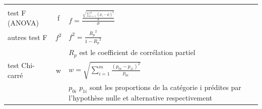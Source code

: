 \documentclass[12pt,]{book}
\begin{document}
\begin{longtable}[]{@{}lcl@{}}
\begin{minipage}[t]{0.46\columnwidth}
\end{minipage}\tabularnewline
\begin{minipage}[t]{0.11\columnwidth}\raggedright
test F (ANOVA)\strut
\end{minipage} & \begin{minipage}[t]{0.35\columnwidth}\centering
f\strut
\end{minipage} & \begin{minipage}[t]{0.46\columnwidth}\raggedright
\(f = \frac{\frac{\sqrt{\sum_{i=1}^k (\mu_i - \mu)^2}}{k}}{\sigma}\)\strut
\end{minipage}\tabularnewline
\begin{minipage}[t]{0.11\columnwidth}\raggedright
autres test F\strut
\end{minipage} & \begin{minipage}[t]{0.35\columnwidth}\centering
\(f^2\)\strut
\end{minipage} & \begin{minipage}[t]{0.46\columnwidth}\raggedright
\(f^2 = \frac{{R_p}^2}{1-{R_p}^2}\)\strut
\end{minipage}\tabularnewline
\begin{minipage}[t]{0.11\columnwidth}\raggedright
\strut
\end{minipage} & \begin{minipage}[t]{0.35\columnwidth}\centering
\strut
\end{minipage} & \begin{minipage}[t]{0.46\columnwidth}\raggedright
\({R_p}\) est le coefficient de corrélation partiel\strut
\end{minipage}\tabularnewline
\begin{minipage}[t]{0.11\columnwidth}\raggedright
test Chi-carré\strut
\end{minipage} & \begin{minipage}[t]{0.35\columnwidth}\centering
w\strut
\end{minipage} & \begin{minipage}[t]{0.46\columnwidth}\raggedright
\(w = \sqrt{ \sum_{i=1}^m \frac{(p_{0i} - p_{1i})^2 }{ p_{0i}} }\)\strut
\end{minipage}\tabularnewline
\begin{minipage}[t]{0.11\columnwidth}\raggedright
\strut
\end{minipage} & \begin{minipage}[t]{0.35\columnwidth}\centering
\strut
\end{minipage} & \begin{minipage}[t]{0.46\columnwidth}\raggedright
\(p_{0i}\) \(p_{1i}\) sont les proportions de la catégorie i prédites par l'hypothèse nulle et alternative respectivement\strut
\end{minipage}\tabularnewline
\bottomrule
\end{longtable}
\end{document}
